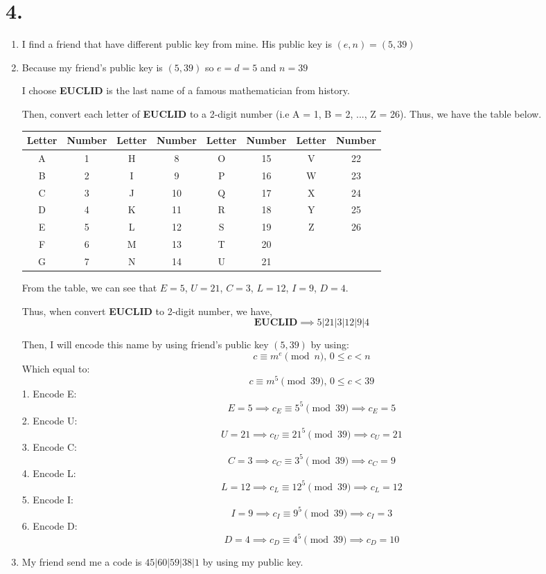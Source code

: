 \documentclass{article}
\begin{document}
	\section*{4. }
	\begin{enumerate}[label=({\alph*})]
		\item I find a friend that have different public key from mine. His public key is \((e, n) = (5, 39)\)
		\item Because my friend's public key is \((5, 39)\) so \(e = d = 5\) and \(n = 39\)
		
		I choose \textbf{EUCLID} is the last name of a famous mathematician from history.

		Then, convert each letter of \textbf{EUCLID} to a 2-digit number (i.e A = 1, B = 2, ..., Z = 26). Thus, we have the table below.
		\begin{center}
			\begin{tabular}{| c | c ||| c | c |||c | c ||| c | c |}
				\hline 
				Letter &  Number & Letter & Number & Letter & Number & Letter & Number\\
				\hline
				A & 1 & H & 8 & O & 15 & V & 22\\
				B & 2 & I & 9 & P & 16 & W & 23\\
				C & 3 & J & 10 & Q & 17 & X & 24\\
				D & 4 & K & 11 & R & 18 & Y & 25\\
				E & 5 & L & 12 & S & 19 & Z & 26\\
				F & 6 & M & 13 & T & 20 &   &    \\
				G & 7 & N & 14 & U & 21 &   &    \\
				\hline
			\end{tabular}
		\end{center}
		From the table, we can see that \(E = 5\), \(U = 21\), \(C = 3\), \(L = 12\), \(I = 9\), \(D = 4\).

		Thus, when convert \textbf{EUCLID} to 2-digit number, we have,
		\[\textbf{EUCLID} \implies 5|21|3|12|9|4\]

		Then, I will encode this name by using friend's public key \((5, 39)\) by using:
		\[c \equiv m^e \pmod{n} \text{, } 0 \leq c < n\]
		Which equal to:
		\[c \equiv m^5 \pmod{39} \text{, } 0 \leq c < 39\]
		1. Encode E:
		\[E = 5 \implies c_{E} \equiv 5 ^ 5 \pmod{39} \implies c_{E} = 5\]
		2. Encode U:
		\[U = 21 \implies c_{U} \equiv 21 ^ 5 \pmod{39} \implies c_{U} = 21\]
		3. Encode C:
		\[C = 3 \implies c_{C} \equiv 3 ^ 5 \pmod{39} \implies c_{C} = 9\]
		4. Encode L:
		\[L = 12 \implies c_{L} \equiv 12 ^ 5 \pmod{39} \implies c_{L} = 12\]
		5. Encode I:
		\[I = 9 \implies c_{I} \equiv 9 ^ 5 \pmod{39} \implies c_{I} = 3\]
		6. Encode D:
		\[D = 4 \implies c_{D} \equiv 4 ^ 5 \pmod{39} \implies c_{D} = 10\]
		\item My friend send me a code is \(45|60|59|38|1\) by using my public key.
		

\end{enumerate}
\end{document}

